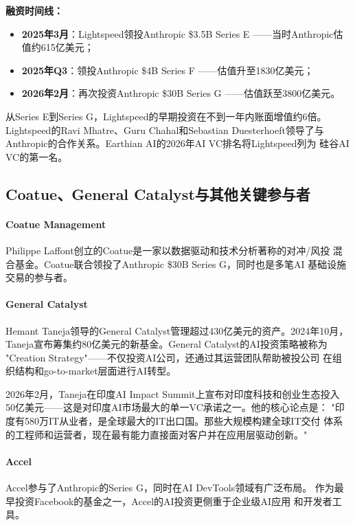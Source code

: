\textbf{融资时间线：}
\begin{itemize}
  \item \textbf{2025年3月}：Lightspeed领投Anthropic \$3.5B Series E
    ——当时Anthropic估值约615亿美元；
  \item \textbf{2025年Q3}：领投Anthropic \$4B Series F
    ——估值升至1830亿美元；
  \item \textbf{2026年2月}：再次投资Anthropic \$30B Series G
    ——估值跃至3800亿美元。
\end{itemize}

从Series E到Series G，Lightspeed的早期投资在不到一年内账面增值约6倍。
Lightspeed的Ravi Mhatre、Guru Chahal和Sebastian Duesterhoeft领导了与
Anthropic的合作关系。Earthian AI的2026年AI VC排名将Lightspeed列为
硅谷AI VC的第一名。

\subsection{Coatue、General Catalyst与其他关键参与者}
\label{subsec:inv-others}

\paragraph{Coatue Management}
Philippe Laffont创立的Coatue是一家以数据驱动和技术分析著称的对冲/风投
混合基金。Coatue联合领投了Anthropic \$30B Series G，同时也是多笔AI
基础设施交易的参与者。

\paragraph{General Catalyst}
Hemant Taneja领导的General Catalyst管理超过430亿美元的资产。2024年10月，
Taneja宣布筹集约80亿美元的新基金。General Catalyst的AI投资策略被称为
"Creation Strategy"——不仅投资AI公司，还通过其运营团队帮助被投公司
在组织结构和go-to-market层面进行AI转型。

2026年2月，Taneja在印度AI Impact Summit上宣布对印度科技和创业生态投入
50亿美元——这是对印度AI市场最大的单一VC承诺之一。他的核心论点是：
"印度有580万IT从业者，是全球最大的IT出口国。那些大规模构建全球IT交付
体系的工程师和运营者，现在最有能力直接面对客户并在应用层驱动创新。"

\paragraph{Accel}
Accel参与了Anthropic的Series G，同时在AI DevTools领域有广泛布局。
作为最早投资Facebook的基金之一，Accel的AI投资更侧重于企业级AI应用
和开发者工具。

